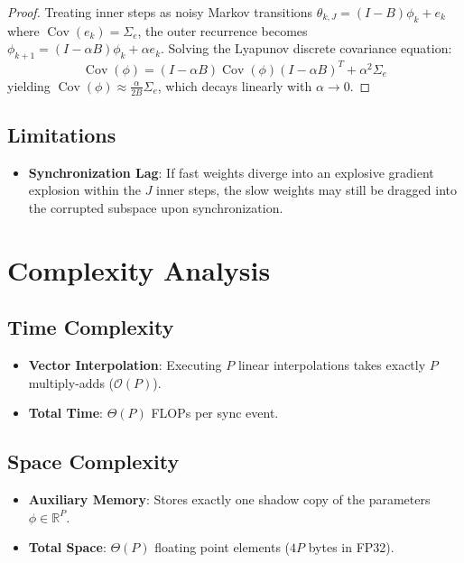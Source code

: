 \documentclass[11pt,a4paper]{article}
\theoremstyle{definition}
\begin{document}
\begin{proof}
Treating inner steps as noisy Markov transitions $\theta_{k, J} = (I - B) \phi_k + e_k$ where $\operatorname{Cov}(e_k) = \Sigma_e$, the outer recurrence becomes $\phi_{k+1} = (I - \alpha B) \phi_k + \alpha e_k$. Solving the Lyapunov discrete covariance equation:
\begin{equation}
\operatorname{Cov}(\phi) = (I - \alpha B) \operatorname{Cov}(\phi) (I - \alpha B)^T + \alpha^2 \Sigma_e
\end{equation}
yielding $\operatorname{Cov}(\phi) \approx \frac{\alpha}{2 B} \Sigma_e$, which decays linearly with $\alpha \to 0$.
\end{proof}

\subsection{Limitations}
\begin{itemize}
    \item \textbf{Synchronization Lag}: If fast weights diverge into an explosive gradient explosion within the $J$ inner steps, the slow weights may still be dragged into the corrupted subspace upon synchronization.
\end{itemize}

\section{Complexity Analysis}

\subsection{Time Complexity}
\begin{itemize}
    \item \textbf{Vector Interpolation}: Executing $P$ linear interpolations takes exactly $P$ multiply-adds ($\mathcal{O}(P)$).
    \item \textbf{Total Time}: $\Theta(P)$ FLOPs per sync event.
\end{itemize}

\subsection{Space Complexity}
\begin{itemize}
    \item \textbf{Auxiliary Memory}: Stores exactly one shadow copy of the parameters $\phi \in \mathbb{R}^P$.
    \item \textbf{Total Space}: $\Theta(P)$ floating point elements ($4P$ bytes in FP32).
\end{itemize}
\end{document}
